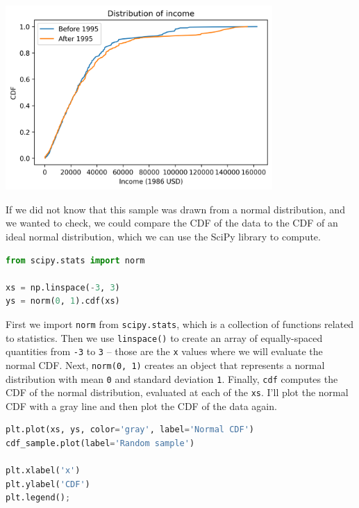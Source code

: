 \begin{center}
\includegraphics[width=4in]{chapters/08_distributions_files/08_distributions_101_0.png}
\end{center}

If we did not know that this sample was drawn from a normal
distribution, and we wanted to check, we could compare the CDF of the
data to the CDF of an ideal normal distribution, which we can use the
SciPy library to compute.

\begin{lstlisting}[language=Python,style=source]
from scipy.stats import norm

xs = np.linspace(-3, 3)
ys = norm(0, 1).cdf(xs)
\end{lstlisting}

First we import \passthrough{\lstinline!norm!} from
\passthrough{\lstinline!scipy.stats!}, which is a collection of
functions related to statistics. Then we use
\passthrough{\lstinline!linspace()!} to create an array of
equally-spaced quantities from \passthrough{\lstinline!-3!} to
\passthrough{\lstinline!3!} -- those are the \passthrough{\lstinline!x!}
values where we will evaluate the normal CDF. Next,
\passthrough{\lstinline!norm(0, 1)!} creates an object that represents a
normal distribution with mean \passthrough{\lstinline!0!} and standard
deviation \passthrough{\lstinline!1!}. Finally,
\passthrough{\lstinline!cdf!} computes the CDF of the normal
distribution, evaluated at each of the \passthrough{\lstinline!xs!}.
I'll plot the normal CDF with a gray line and then plot the CDF of the
data again.

\begin{lstlisting}[language=Python,style=source]
plt.plot(xs, ys, color='gray', label='Normal CDF')
cdf_sample.plot(label='Random sample')

plt.xlabel('x')
plt.ylabel('CDF')
plt.legend();
\end{lstlisting}

